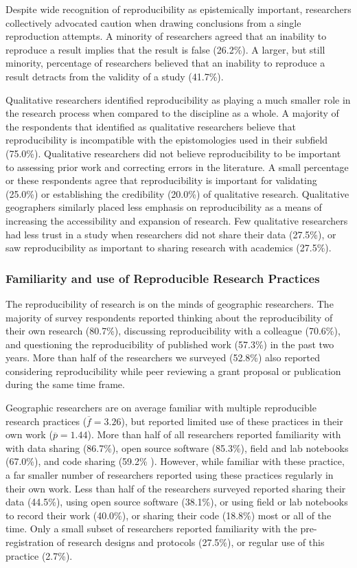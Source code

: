 \documentclass[]{interact}
\theoremstyle{plain}%
\theoremstyle{definition}
\theoremstyle{remark}
\begin{document}
Despite wide recognition of reproducibility as epistemically important, researchers collectively advocated caution when drawing conclusions from a single reproduction attempts. 
A minority of researchers agreed that an inability to reproduce a result implies that the result is false (26.2\%). 
A larger, but still minority, percentage of researchers believed that an inability to reproduce a result detracts from the validity of a study (41.7\%).

Qualitative researchers identified reproducibility as playing a much smaller role in the research process when compared to the discipline as a whole. 
A majority of the respondents that identified as qualitative researchers believe that reproducibility is incompatible with the epistomologies used in their subfield (75.0\%).
Qualitative researchers did not believe reproducibility to be important to assessing prior work and correcting errors in the literature. 
A small percentage or these respondents agree that reproducibility is important for validating (25.0\%) or establishing the credibility (20.0\%) of qualitative research.
Qualitative geographers similarly placed less emphasis on reproducibility as a means of increasing the accessibility and expansion of research.
Few qualitative researchers had less trust in a study when researchers did not share their data (27.5\%), or saw reproducibility as important to sharing research with academics (27.5\%).



\subsubsection*{Familiarity and use of Reproducible Research Practices}
The reproducibility of research is on the minds of geographic researchers. 
The majority of survey respondents reported thinking about the reproducibility of their own research (80.7\%), discussing reproducibility with a colleague (70.6\%), and questioning the reproducibility of published work (57.3\%) in the past two years. 
More than half of the researchers we surveyed (52.8\%) also reported considering reproducibility while peer reviewing a grant proposal or publication during the same time frame. 

Geographic researchers are on average familiar with multiple reproducible research practices ($\overline{f}=3.26$), but reported limited use of these practices in their own work ($\overline{p}=1.44$).
More than half of all researchers reported familiarity with with data sharing (86.7\%), open source software (85.3\%), field and lab notebooks (67.0\%), and code sharing (59.2\% ).
However, while familiar with these practice, a far smaller number of researchers reported using these practices regularly in their own work. 
Less than half of the researchers surveyed reported sharing their data (44.5\%), using open source software (38.1\%), or using field or lab notebooks to record their work (40.0\%), or sharing their code (18.8\%) most or all of the time. 
Only a small subset of researchers reported familiarity with the pre-registration of research designs and protocols (27.5\%), or regular use of this practice (2.7\%).
\end{document}
